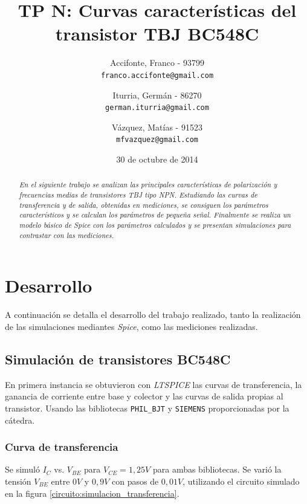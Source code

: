 \documentclass[10pt,spanish,a4paper,openany,notitlepage]{article}
\begin{document}
\title{\textbf{TP N: Curvas características del transistor TBJ BC548C}}
\author{
  Accifonte, Franco - 93799\\
  \texttt{franco.accifonte@gmail.com}  
  \and
  Iturria, Germán  - 86270 \\
  \texttt{german.iturria@gmail.com}
  \and
   Vázquez, Matías - 91523\\
  \texttt{mfvazquez@gmail.com}
}
\date{30 de octubre de 2014}
\maketitle

\begin{abstract} %
\emph{En el siguiente trabajo se analizan las principales características de polarización y frecuencias medias de transistores TBJ tipo NPN. Estudiando las curvas de transferencia y de salida, obtenidas en mediciones, se consiguen los parámetros característicos y se calculan los parámetros de pequeña señal. Finalmente se realiza un modelo básico de Spice con los parámetros calculados y se presentan simulaciones para contrastar con las mediciones.}
\end{abstract}

\section{Desarrollo}

A continuación se detalla el desarrollo del trabajo realizado, tanto la realización de las simulaciones mediantes \emph{Spice}, como las mediciones realizadas.

\subsection{Simulación de transistores BC548C}

En primera instancia se obtuvieron con \emph{LTSPICE} las curvas de transferencia, la ganancia de corriente entre base y colector y las curvas de salida  propias al transistor. Usando las bibliotecas  
 \texttt{PHIL\_BJT} y \texttt{SIEMENS} proporcionadas por la cátedra.

\subsubsection{Curva de transferencia}

Se simuló $I_C$ vs. $V_{BE}$ para $V_{CE} = 1,25 \unit{V}$ para ambas bibliotecas. Se varió la tensión $V_{BE}$ entre $0\unit{V}$ y $0,9\unit{V}$ con pasos de $0,01\unit{V}$, utilizando el circuito simulado en la figura \ref{circuito:simulacion_transferencia}.
\end{document}

